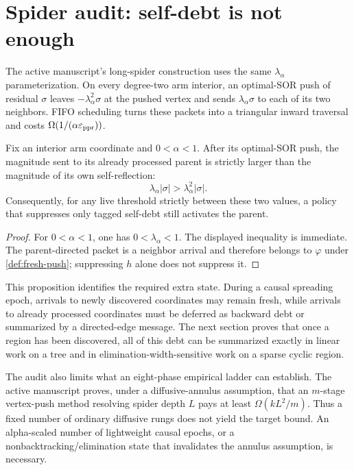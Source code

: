 \section{Spider audit: self-debt is not enough}
\label{sec:spider}

The active manuscript's long-spider construction uses the same
$\lambda_\alpha$ parameterization.  On every degree-two arm interior, an
optimal-SOR push of residual $\sigma$ leaves
$-\lambda_\alpha^2\sigma$ at the pushed vertex and sends
$\lambda_\alpha\sigma$ to each of its two neighbors.  FIFO scheduling turns
these packets into a triangular inward traversal and costs
$\Omega(1/(\alpha\varepsilon_{\mathrm{ppr}}))$.

\begin{proposition}
\label{prop:backflow}
Fix an interior arm coordinate and $0<\alpha<1$.  After its optimal-SOR push,
the magnitude sent to its already processed parent is strictly larger than
the magnitude of its own self-reflection:
\begin{equation}
 \lambda_\alpha|\sigma|
 >\lambda_\alpha^2|\sigma|.
 \label{eq:backflow-dominates}
\end{equation}
Consequently, for any live threshold strictly between these two values, a
policy that suppresses only tagged self-debt still activates the parent.
\end{proposition}

\begin{proof}
For $0<\alpha<1$, one has $0<\lambda_\alpha<1$.  The displayed inequality is
immediate.  The parent-directed packet is a neighbor arrival and therefore
belongs to $\varphi$ under \cref{def:fresh-push}; suppressing $h$ alone does
not suppress it.
\end{proof}

This proposition identifies the required extra state.  During a causal
spreading epoch, arrivals to newly discovered coordinates may remain fresh,
while arrivals to already processed coordinates must be deferred as backward
debt or summarized by a directed-edge message.  The next section proves that
once a region has been discovered, all of this debt can be summarized exactly
in linear work on a tree and in elimination-width-sensitive work on a sparse
cyclic region.

The audit also limits what an eight-phase empirical ladder can establish.
The active manuscript proves, under a diffusive-annulus assumption, that an
$m$-stage vertex-push method resolving spider depth $L$ pays at least
$\Omega(kL^2/m)$.  Thus a fixed number of ordinary diffusive rungs does not
yield the target bound.  An alpha-scaled number of lightweight causal epochs,
or a nonbacktracking/elimination state that invalidates the annulus
assumption, is necessary.
